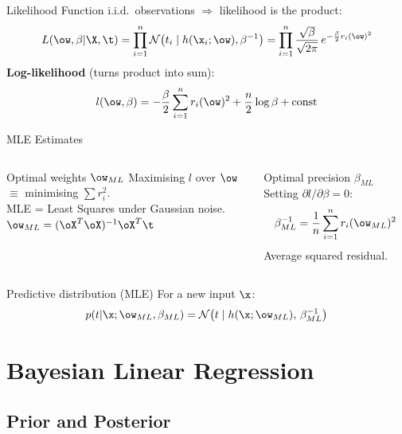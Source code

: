 \begin{frame}{Likelihood Function}
  i.i.d.\ observations $\Rightarrow$ likelihood is the product:
  \[
    L(\ow,\beta|\X,\t) = \prod_{i=1}^n \mathcal{N}\bigl(t_i\mid h(\x_i;\ow),\beta^{-1}\bigr)
    = \prod_{i=1}^n \frac{\sqrt{\beta}}{\sqrt{2\pi}}\,e^{-\frac{\beta}{2}r_i(\ow)^2}
  \]
  \textbf{Log-likelihood} (turns product into sum):
  \[
    l(\ow,\beta) = -\frac{\beta}{2}\sum_{i=1}^n r_i(\ow)^2 + \frac{n}{2}\log\beta + \text{const}
  \]
\end{frame}

\begin{frame}{MLE Estimates}
  \begin{columns}[T]
  \begin{block}{Optimal weights $\ow_{ML}$}
    Maximising $l$ over $\ow$ $\equiv$ minimising $\sum r_i^2$.\\[4pt]
    \alert{MLE = Least Squares} under Gaussian noise.\\
    $\ow_{ML} = (\oX^T\oX)^{-1}\oX^T\t$
  \end{block}
  \begin{block}{Optimal precision $\beta_{ML}$}
    Setting $\partial l/\partial\beta = 0$:
    \[
      \beta_{ML}^{-1} = \frac{1}{n}\sum_{i=1}^n r_i(\ow_{ML})^2
    \]
    Average squared residual.
  \end{block}
  \end{columns}
  \vspace{.4em}
  \begin{exampleblock}{Predictive distribution (MLE)}
    For a new input $\x$:
    \[
      p(t|\x;\ow_{ML},\beta_{ML}) = \mathcal{N}\bigl(t\mid h(\x;\ow_{ML}),\,\beta_{ML}^{-1}\bigr)
    \]
  \end{exampleblock}
\end{frame}

\section{Bayesian Linear Regression}

\subsection{Prior and Posterior}

